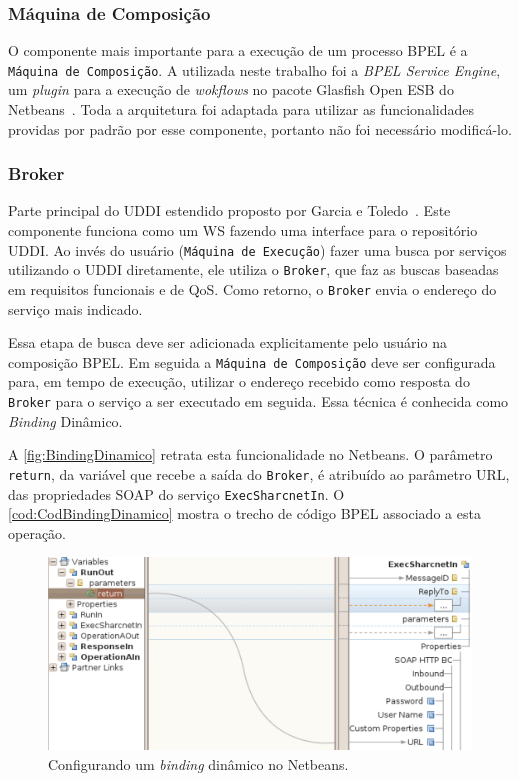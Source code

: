\documentclass[12pt]{report} %
\begin{document}
	\subsubsection{Máquina de Composição}
	O componente mais importante para a execução de um processo BPEL é a \texttt{Máquina de Composição}.
	A utilizada neste trabalho foi a \textit{BPEL Service Engine}, um \textit{plugin} para a execução de \textit{wokflows} no pacote Glasfish Open ESB do Netbeans~\cite{ESB:website}.
	Toda a arquitetura foi adaptada para utilizar as funcionalidades providas por padrão por esse componente, portanto não foi necessário modificá-lo.	
	
	\subsubsection{Broker}
	\label{subsec:Broker}
	Parte principal do UDDI estendido proposto por Garcia e Toledo~\cite{DiegoUDDI}.
	Este componente funciona como um WS fazendo uma interface para o repositório UDDI.
	Ao invés do usuário (\texttt{Máquina de Execução}) fazer uma busca por serviços utilizando o UDDI diretamente, ele utiliza o \texttt{Broker}, que faz as buscas baseadas em requisitos funcionais e de QoS.
	Como retorno, o \texttt{Broker} envia o endereço do serviço mais indicado.
		
	Essa etapa de busca deve ser adicionada explicitamente pelo usuário na composição BPEL.
	Em seguida a \texttt{Máquina de Composição} deve ser configurada para, em tempo de execução, utilizar o endereço recebido como resposta do \texttt{Broker} para o serviço a ser executado em seguida.
	Essa técnica é conhecida como \textit{Binding} Dinâmico.
	
	A \autoref{fig:BindingDinamico} retrata esta funcionalidade no Netbeans.
	O parâmetro \texttt{return}, da variável que recebe a saída do \texttt{Broker}, é atribuído ao parâmetro URL, das propriedades SOAP do serviço \texttt{ExecSharcnetIn}.
	O \autoref{cod:CodBindingDinamico} mostra o trecho de código BPEL associado a esta operação.
	
	\begin{figure}[!htb]%
	    \begin{center}
		\includegraphics[scale=0.65]{imagens/BindingDinamico.pdf} 
		\caption{Configurando um \textit{binding} dinâmico no Netbeans.}
		\label{fig:BindingDinamico}
	    \end{center}
	\end{figure}
	
\end{document}
